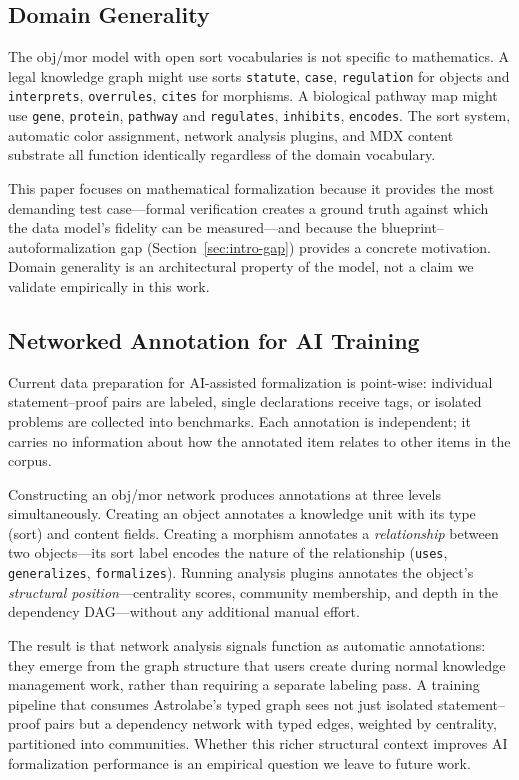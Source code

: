 \subsection{Domain Generality}
\label{sec:disc-generality}

The obj/mor model with open sort vocabularies is not specific to mathematics. A legal knowledge graph might use sorts \texttt{statute}, \texttt{case}, \texttt{regulation} for objects and \texttt{interprets}, \texttt{overrules}, \texttt{cites} for morphisms. A biological pathway map might use \texttt{gene}, \texttt{protein}, \texttt{pathway} and \texttt{regulates}, \texttt{inhibits}, \texttt{encodes}. The sort system, automatic color assignment, network analysis plugins, and MDX content substrate all function identically regardless of the domain vocabulary.

This paper focuses on mathematical formalization because it provides the most demanding test case---formal verification creates a ground truth against which the data model's fidelity can be measured---and because the blueprint--autoformalization gap (Section~\ref{sec:intro-gap}) provides a concrete motivation. Domain generality is an architectural property of the model, not a claim we validate empirically in this work.


\subsection{Networked Annotation for AI Training}
\label{sec:disc-ai-annotation}

Current data preparation for AI-assisted formalization is point-wise: individual statement--proof pairs are labeled, single declarations receive tags, or isolated problems are collected into benchmarks. Each annotation is independent; it carries no information about how the annotated item relates to other items in the corpus.

Constructing an obj/mor network produces annotations at three levels simultaneously. Creating an object annotates a knowledge unit with its type (sort) and content fields. Creating a morphism annotates a \emph{relationship} between two objects---its sort label encodes the nature of the relationship (\texttt{uses}, \texttt{generalizes}, \texttt{formalizes}). Running analysis plugins annotates the object's \emph{structural position}---centrality scores, community membership, and depth in the dependency DAG---without any additional manual effort.

The result is that network analysis signals function as automatic annotations: they emerge from the graph structure that users create during normal knowledge management work, rather than requiring a separate labeling pass. A training pipeline that consumes Astrolabe's typed graph sees not just isolated statement--proof pairs but a dependency network with typed edges, weighted by centrality, partitioned into communities. Whether this richer structural context improves AI formalization performance is an empirical question we leave to future work.


